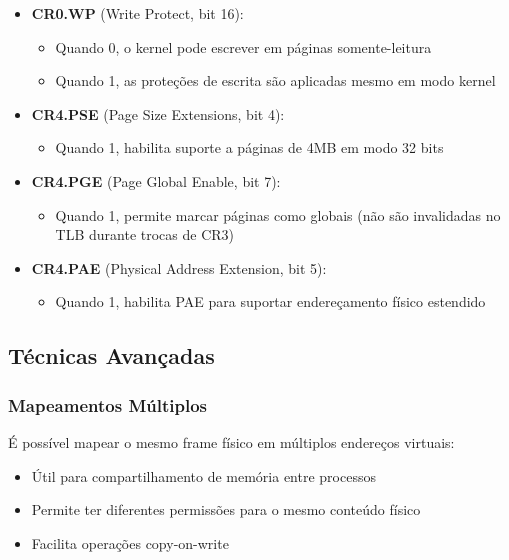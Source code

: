 \begin{itemize}
    \item \textbf{CR0.WP} (Write Protect, bit 16):
        \begin{itemize}
            \item Quando 0, o kernel pode escrever em páginas somente-leitura
            \item Quando 1, as proteções de escrita são aplicadas mesmo em modo kernel
        \end{itemize}

    \item \textbf{CR4.PSE} (Page Size Extensions, bit 4):
        \begin{itemize}
            \item Quando 1, habilita suporte a páginas de 4MB em modo 32 bits
        \end{itemize}

    \item \textbf{CR4.PGE} (Page Global Enable, bit 7):
        \begin{itemize}
            \item Quando 1, permite marcar páginas como globais (não são invalidadas no TLB durante trocas de CR3)
        \end{itemize}

    \item \textbf{CR4.PAE} (Physical Address Extension, bit 5):
        \begin{itemize}
            \item Quando 1, habilita PAE para suportar endereçamento físico estendido
        \end{itemize}
\end{itemize}

\subsection{Técnicas Avançadas}
\label{subsec:tecnicas_avancadas}

\subsubsection{Mapeamentos Múltiplos}

É possível mapear o mesmo frame físico em múltiplos endereços virtuais:
\begin{itemize}
    \item Útil para compartilhamento de memória entre processos
    \item Permite ter diferentes permissões para o mesmo conteúdo físico
    \item Facilita operações copy-on-write
\end{itemize}

